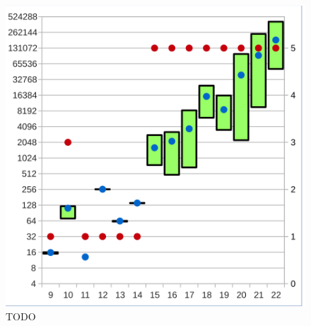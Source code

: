 \begin{figure}[!h]
\begin{minipage}[c]{0.45\textwidth}
  \includegraphics[scale=0.55]{images/data_add_xor}
  \end{minipage}
  \caption{TODO}
  \label{fig:data_add}
\end{figure}